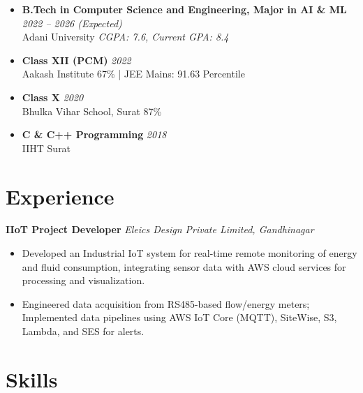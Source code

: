\documentclass[10pt,a4paper]{article}
\begin{document}
\begin{itemize}

    \item \textbf{B.Tech in Computer Science and Engineering, Major in AI \& ML} \hfill \textit{2022 -- 2026 (Expected)} \\
    Adani University \hfill \textit{CGPA: 7.6, Current GPA: 8.4}

    \item \textbf{Class XII (PCM)} \hfill \textit{2022} \\
    Aakash Institute \hfill 67\% \quad | \quad JEE Mains: 91.63 Percentile

    \item \textbf{Class X} \hfill \textit{2020} \\
    Bhulka Vihar School, Surat \hfill 87\%

    \item \textbf{C \& C++ Programming} \hfill \textit{2018} \\
    IIHT Surat

\end{itemize}



\section*{Experience}
\textbf{IIoT Project Developer} \hfill \textit{Eleics Design Private Limited, Gandhinagar}
\begin{itemize}
    \item Developed an Industrial IoT system for real-time remote monitoring of energy and fluid consumption, integrating sensor data with AWS cloud services for processing and visualization.
    \item Engineered data acquisition from RS485-based flow/energy meters; Implemented data pipelines using AWS IoT Core (MQTT), SiteWise, S3, Lambda, and SES for alerts.
\end{itemize}

\section*{Skills}
\end{document}
